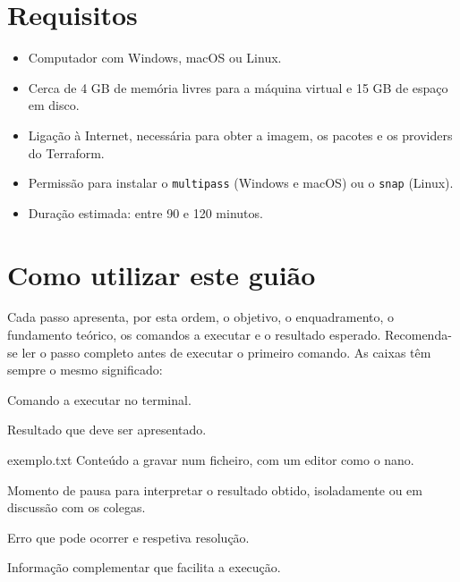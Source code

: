 \documentclass[11pt,a4paper]{article}
\newcommand{\cmd}[1]{\texttt{#1}}
\begin{document}
\section*{Requisitos}

\begin{itemize}
  \item Computador com Windows, macOS ou Linux.
  \item Cerca de 4 GB de memória livres para a máquina virtual e 15 GB de espaço em disco.
  \item Ligação à Internet, necessária para obter a imagem, os pacotes e os providers do Terraform.
  \item Permissão para instalar o \cmd{multipass} (Windows e macOS) ou o \cmd{snap} (Linux).
  \item Duração estimada: entre 90 e 120 minutos.
\end{itemize}

\section*{Como utilizar este guião}

Cada passo apresenta, por esta ordem, o objetivo, o enquadramento, o fundamento teórico, os comandos a executar e o resultado esperado. Recomenda-se ler o passo completo antes de executar o primeiro comando. As caixas têm sempre o mesmo significado:

\begin{terminal}
Comando a executar no terminal.
\end{terminal}

\begin{saida}
Resultado que deve ser apresentado.
\end{saida}

\begin{ficheiro}{exemplo.txt}
Conteúdo a gravar num ficheiro, com um editor como o nano.
\end{ficheiro}

\begin{observe}
Momento de pausa para interpretar o resultado obtido, isoladamente ou em discussão com os colegas.
\end{observe}

\begin{erro}
Erro que pode ocorrer e respetiva resolução.
\end{erro}

\begin{nota}
Informação complementar que facilita a execução.
\end{nota}
\end{document}
